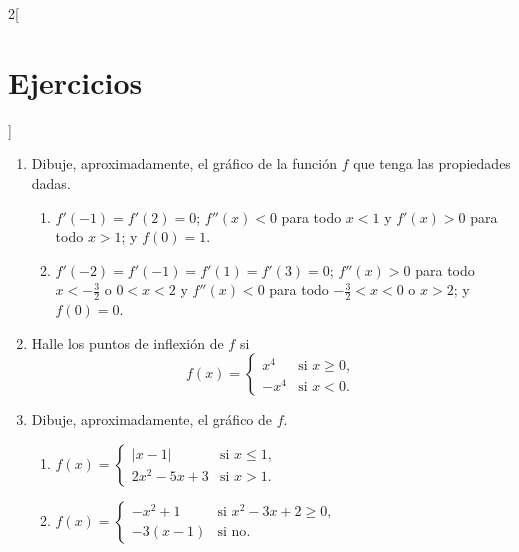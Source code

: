 \begin{multicols}{2}[\section{Ejercicios}]
\begin{enumerate}[leftmargin=*]
\item Dibuje, aproximadamente, el gráfico de la función $f$ que tenga las propiedades dadas.
    \begin{enumerate}[leftmargin=*]
    \item $f'(-1) = f'(2) = 0$; $f''(x) < 0$ para todo $x < 1$ y $f'(x) > 0$ para todo $x
        > 1$; y $f(0) = 1$.

    \item $f'(-2) = f'(-1) = f'(1) = f'(3) = 0$; $f''(x) > 0$ para todo $x < -\frac{3}{2}$
        o $0 < x < 2$ y $f''(x) < 0$ para todo $-\frac{3}{2} < x < 0$ o $x > 2$; y $f(0) =
        0$.
    \end{enumerate}

\item Halle los puntos de inflexión de $f$ si
    \[
      f(x) =
      \begin{cases}
      x^4 & \text{si } x \geq 0, \\
      -x^4 & \text{si } x < 0.
      \end{cases}
    \]

\item Dibuje, aproximadamente, el gráfico de $f$.
    \begin{enumerate}[leftmargin=*]
    \item $\displaystyle f(x) =
        \begin{cases}
          |x - 1| & \text{si } x \leq 1, \\
          2x^2 - 5x + 3 & \text{si } x > 1.
        \end{cases}$
    \item $\displaystyle f(x) =
        \begin{cases}
          -x^2 + 1 & \text{si } x^2 - 3x + 2 \geq 0, \\
          -3(x - 1) & \text{si no}.
        \end{cases}$
    \end{enumerate}


\end{enumerate}
\end{multicols}

